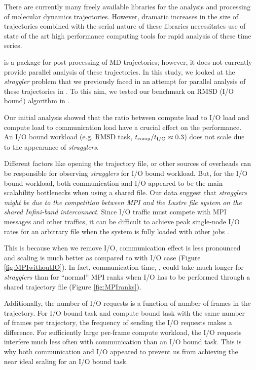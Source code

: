 \label{concl} 
There are currently many freely available libraries for the analysis and processing of molecular dynamics trajectories.
However, dramatic increases in the size of trajectories combined with the serial nature of these libraries necessitates 
use of state of the art high performance computing tools for rapid analysis of these time series. 

 is a package for post-processing of MD trajectories; however, it does not currently provide parallel analysis of these trajectories.
In this study, we looked at the \emph{straggler} problem that we previously faced in an attempt for parallel analysis of these trajectories in  \cite{Khoshlessan:2017ab}.
To this aim, we tested our benchmark on RMSD (I/O bound) algorithm in .

Our initial analysis showed that the ratio between compute load to I/O load and compute load to communication load have a crucial effect on the performance. 
An I/O bound workload (e.g. RMSD task, ${t}_{\text{comp}}/{t}_{\text{I/O}} \approx 0.3$) does not scale due to the appearance of \emph{stragglers}. 

Different factors like opening the trajectory file, or other sources of overheads can be responsible for observing \emph{stragglers} for I/O bound workload.
But, for the I/O bound workload, both communication and I/O appeared to be the main scalability bottlenecks when using a shared file.
Our data suggest that \emph{stragglers might be due to the competition between MPI and the Lustre file system on the shared Infini-band interconnect}.  
Since I/O traffic must compete with MPI messages and other traffics, it can be difficult to achieve peak single-node I/O rates for an arbitrary file when the system is fully loaded with other jobs \cite{VMD2013, Kevin2018}. 

This is because when we remove I/O, communication effect is less pronounced and scaling is much better as compared to with I/O case (Figure \ref{fig:MPIwithoutIO}).
In fact, communication time, \tcomm, could take much longer for \emph{stragglers} than for ``normal'' MPI ranks when I/O has to be performed through a shared trajectory file (Figure \ref{fig:MPIranks}). 

Additionally, the number of I/O requests is a function of number of frames in the trajectory. 
For I/O bound task and compute bound task with the same number of frames per trajectory, the frequency of sending the I/O requests makes a difference.
For sufficiently large per-frame compute workload, the I/O requests interfere much less often with communication than an I/O bound task.
This is why both communication and I/O appeared to prevent us from achieving the near ideal scaling for an I/O bound task.

